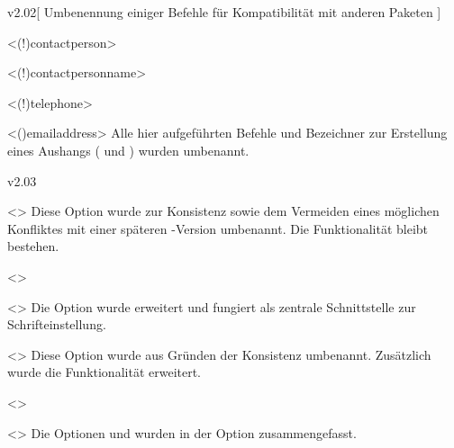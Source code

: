 \begin{Entity}{}
\begin{NoIndexDefault}
\begin{Cessations}{v2.02}[%
  Umbenennung einiger Befehle für Kompatibilität mit anderen Paketen%
]
\begin{Entity}{}
\begin{Cessation}
  {}
  <\Macro(!){contactperson}>
\begin{Cessation}
  {}
  <\Term(!){contactpersonname}>
\begin{Cessation}
  {}
  <\Macro(!){telephone}>
\begin{Cessation}
  {}
  <\Macro(){emailaddress}>
\printdeclarationlist
%
Alle hier aufgeführten Befehle und Bezeichner zur Erstellung eines Aushangs 
( und ) wurden umbenannt.
\end{Cessation}
\end{Cessation}
\end{Cessation}
\end{Cessation}
\end{Entity}
\end{Cessations}



\begin{Cessations}{v2.03}
\begin{Cessation}
  {}
  <>
\printdeclarationlist
%
Diese Option wurde zur Konsistenz sowie dem Vermeiden eines möglichen 
Konfliktes mit einer späteren \KOMAScript-Version umbenannt. Die Funktionalität 
bleibt bestehen.
\end{Cessation}

\begin{Cessation}
  {}
  <>
\begin{Cessation}
  {}
  <>
\printdeclarationlist
%
Die Option  wurde erweitert und fungiert als zentrale 
Schnittstelle zur Schrifteinstellung. 
\end{Cessation}
\end{Cessation}

\begin{Cessation}
  {}
  <>
\printdeclarationlist
%
Diese Option wurde aus Gründen der Konsistenz umbenannt. Zusätzlich wurde die 
Funktionalität erweitert.
\end{Cessation}

\begin{Cessation}
  {}
  <>
\begin{Cessation}
  {}
  <>
\printdeclarationlist
%
Die Optionen  und  wurden in der Option 
 zusammengefasst.
\end{Cessation}
\end{Cessation}


\end{Cessations}
\end{NoIndexDefault}
\end{Entity}
